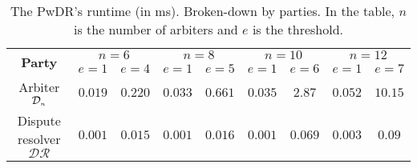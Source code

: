 

 \begin{table*}[!htb]

\caption{ \small The PwDR's runtime (in ms). Broken-down by parties. In the table, $n$ is the number of arbiters and $e$ is the threshold.} \label{table::PwDR-runtime} 
 \vspace{-2mm}
\begin{center}

\begin{tabular}{|c|c|c|c|c|c|c|c|c|} 

   \hline
   

\multirow{2}{*}{\scriptsize \textbf{Party}}& \multicolumn{2}{c|}{\scriptsize $n=6$}& \multicolumn{2}{c|}{\scriptsize $n=8$}&\multicolumn{2}{c|}{\scriptsize $n=10$}&\multicolumn{2}{c|}{\scriptsize $n=12$}\\
 \cline{2-9} 
&\scriptsize$e=1$&\scriptsize$e=4$&\scriptsize$e=1$ &\scriptsize$e=5$&\scriptsize$e=1$&\scriptsize$e=6$&\scriptsize$e=1$&\scriptsize$e=7$\\



         
            \cline{1-5} 

 
   \scriptsize   {Arbiter $\mathcal{D}_{\scriptscriptstyle n}$ }&  \cellcolor{gray!20}\scriptsize$0.019$&  \cellcolor{gray!20}\scriptsize$0.220$& \cellcolor{gray!20}  \scriptsize$0.033$&   \cellcolor{gray!20}\scriptsize$0.661$&  \cellcolor{gray!20}\scriptsize$0.035$&  \cellcolor{gray!20}\scriptsize$2.87$&  \cellcolor{gray!20}\scriptsize$0.052$&  \cellcolor{gray!20}\scriptsize$10.15$\\      
           
            \cline{1-9} 

 \scriptsize Dispute resolver $\mathcal{DR}$&  \cellcolor{gray!20}\scriptsize$0.001$&  \cellcolor{gray!20}\scriptsize$0.015$&   \cellcolor{gray!20}\scriptsize $0.001$&   \cellcolor{gray!20}\scriptsize$0.016$&  \cellcolor{gray!20}\scriptsize$0.001$&  \cellcolor{gray!20}\scriptsize$0.069$&  \cellcolor{gray!20}\scriptsize$0.003$&  \cellcolor{gray!20}\scriptsize$0.09$\\
 
 \hline
 
\end{tabular}  %
\end{center}

\end{table*}




